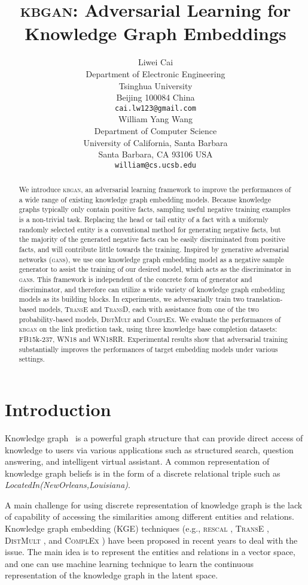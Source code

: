 \documentclass[11pt,a4paper]{article}
\title{\textsc{kbgan}: Adversarial Learning for Knowledge Graph Embeddings}
\author{Liwei Cai \\
  Department of Electronic Engineering \\
  Tsinghua University \\
  Beijing 100084 China \\
  {\tt cai.lw123@gmail.com} \\\And
  William Yang Wang \\
  Department of Computer Science \\
  University of California, Santa Barbara \\
  Santa Barbara, CA 93106 USA\\
  {\tt william@cs.ucsb.edu} \\}
\begin{document}
\maketitle
\begin{abstract}
We introduce \textsc{kbgan}, an adversarial learning framework to improve the performances of a wide range of existing knowledge graph embedding models. Because knowledge graphs typically only contain positive facts, sampling useful negative training examples is a non-trivial task. Replacing the head or tail entity of a fact with a uniformly randomly selected entity is a conventional method for generating negative facts, but the majority of the generated negative facts can be easily discriminated from positive facts, and will contribute little towards the training. Inspired by generative adversarial networks (\textsc{gan}s), we use one knowledge graph embedding model as a negative sample generator to assist the training of our desired model, which acts as the discriminator in \textsc{gan}s. 
This framework is independent of the concrete form of generator and discriminator, and therefore can utilize a wide variety of knowledge graph embedding models as its building blocks. In experiments, we adversarially train two translation-based models, \textsc{TransE} and \textsc{TransD}, each with assistance from one of the two probability-based models, \textsc{DistMult} and \textsc{ComplEx}. We evaluate the performances of \textsc{kbgan} on the link prediction task, using three knowledge base completion datasets: FB15k-237, WN18 and WN18RR. Experimental results show that adversarial training substantially improves the performances of target embedding models under various settings.
\end{abstract}

\section{Introduction}
Knowledge graph~\cite{dong2014knowledge} is a powerful graph structure that can provide direct access of knowledge to users via various applications such as structured search, question answering, and intelligent virtual assistant. A common representation of knowledge graph beliefs is in the form of a discrete relational triple such as \emph{LocatedIn(NewOrleans,Louisiana)}.

A main challenge for using discrete representation of knowledge graph is the lack of capability of accessing the similarities among different entities and relations. Knowledge graph embedding (KGE) techniques (e.g., \textsc{rescal} \cite{nickel2011three}, \textsc{TransE} \cite{bordes2013translating}, \textsc{DistMult} \cite{yang2015embedding}, and \textsc{ComplEx} \cite{trouillon2016complex}) have been proposed in recent years to deal with the issue. The main idea is to represent the entities and relations in a vector space, and one can use machine learning technique to learn the continuous representation of the knowledge graph in the latent space.
\end{document}
